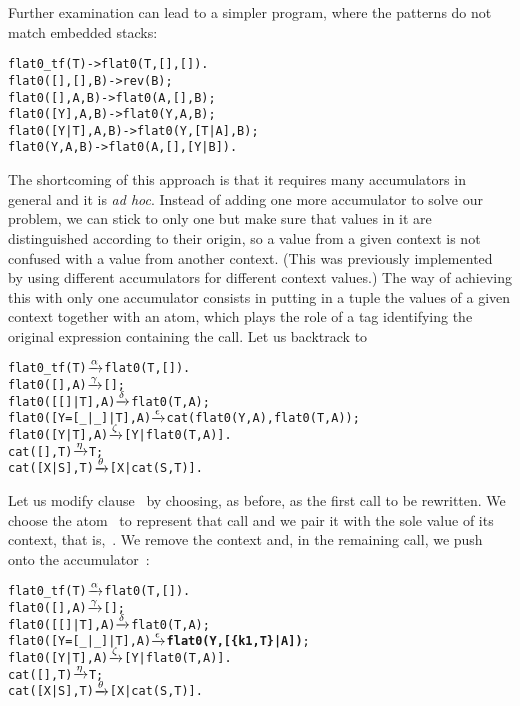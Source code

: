 Further examination can lead to a simpler program, where the patterns
do not match embedded stacks:
\begin{alltt}
flat0\_tf(T)       -> flat0(T,[],[]).
flat0(   [],[],B) -> rev(B);
flat0(   [], A,B) -> flat0(A,   [],    B);
flat0(  [Y], A,B) -> flat0(Y,    A,    B);\hfill% \emph{Optimisation}
flat0([Y|T], A,B) -> flat0(Y,[T|A],    B);
flat0(    Y, A,B) -> flat0(A,   [],[Y|B]).
\end{alltt}
The shortcoming of this approach is that it requires many accumulators
in general and it is \emph{ad hoc}. Instead of adding one more
accumulator to solve our problem, we can stick to only one but make
sure that values in it are distinguished according to their origin, so
a value from a given context is not confused with a value from another
context. (This was previously implemented by using different
accumulators for different context values.) The way of achieving this
with only one accumulator consists in putting in a tuple the values of
a given context together with an atom, which plays the role of a tag
identifying the original expression containing the call. Let us
backtrack to
\begin{alltt}
flat0\_tf(T)          \(\smashedrightarrow{\alpha}\) flat0(T,[]).
flat0(         [],A) \(\smashedrightarrow{\gamma}\) [];\hfill% A \emph{unused yet}
flat0(     [[]|T],A) \(\smashedrightarrow{\delta}\) flat0(T,A);
flat0([Y=[\_|\_]|T],A) \(\smashedrightarrow{\epsilon}\) cat(flat0(Y,A),flat0(T,A));
flat0(      [Y|T],A) \(\smashedrightarrow{\zeta}\) [Y|flat0(T,A)].
cat(   [],T)         \(\smashedrightarrow{\eta}\) T;
cat([X|S],T)         \(\smashedrightarrow{\theta}\) [X|cat(S,T)].
\end{alltt}
Let us modify clause~\clause{\epsilon} by choosing, as before,
 as the first call to be rewritten. We choose the
atom~ to represent that call and we pair it with the sole
value of its context, that is,~. We remove the context
 and, in the remaining
call, we push~ onto the accumulator~:
\begin{alltt}
flat0\_tf(T)          \(\smashedrightarrow{\alpha}\) flat0(T,[]).
flat0(         [],A) \(\smashedrightarrow{\gamma}\) [];\hfill% A \emph{unused yet}
flat0(     [[]|T],A) \(\smashedrightarrow{\delta}\) flat0(T,A);
flat0([Y=[\_|\_]|T],A) \(\smashedrightarrow{\epsilon}\) \textbf{flat0(Y,[\{k1,T\}|A])};
flat0(      [Y|T],A) \(\smashedrightarrow{\zeta}\) [Y|flat0(T,A)].
cat(   [],T)         \(\smashedrightarrow{\eta}\) T;
cat([X|S],T)         \(\smashedrightarrow{\theta}\) [X|cat(S,T)].
\end{alltt}
